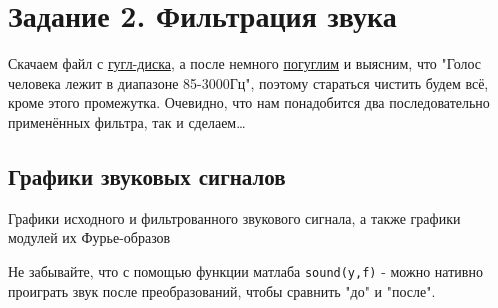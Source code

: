 \chapter{Задание 2. Фильтрация звука}
\label{ch:chap3}



\lstset{style=mystyle}

Скачаем файл с \href{https://drive.google.com/drive/folders/1o8ozGv-bwYWuNpUlfYqM3rDu85QSQ0JW}{гугл-диска}, а после немного \href{https://habr.com/ru/companies/intel/articles/558224/}{погуглим} и выясним, что "Голос человека лежит в диапазоне 85-3000Гц", поэтому стараться чистить будем всё, кроме этого промежутка.
Очевидно, что нам понадобится два последовательно применённых фильтра, так и сделаем\dots


\section{Графики звуковых сигналов}

Графики исходного и фильтрованного звукового сигнала,
 а также графики модулей их Фурье-образов

 Не забывайте, что с помощью функции матлаба \texttt{sound(y,f)} - можно нативно проиграть звук после преобразований, чтобы сравнить "до" и "после".

